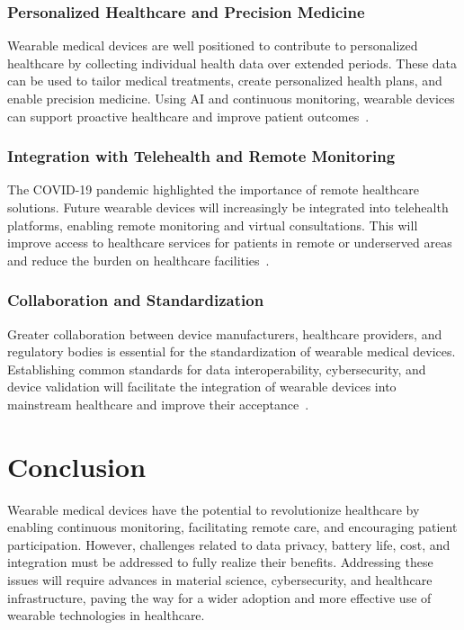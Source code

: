 \documentclass[journal]{IEEEtran}
\begin{document}
        \subsubsection{Personalized Healthcare and Precision Medicine}

        Wearable medical devices are well positioned to contribute to personalized healthcare by collecting individual health data over extended periods. These data can be used to tailor medical treatments, create personalized health plans, and enable precision medicine. Using AI and continuous monitoring, wearable devices can support proactive healthcare and improve patient outcomes~\cite{Cusack2024}.

        \subsubsection{Integration with Telehealth and Remote Monitoring}

        The COVID-19 pandemic highlighted the importance of remote healthcare solutions. Future wearable devices will increasingly be integrated into telehealth platforms, enabling remote monitoring and virtual consultations. This will improve access to healthcare services for patients in remote or underserved areas and reduce the burden on healthcare facilities~\cite{Nahavandi2022}.

        \subsubsection{Collaboration and Standardization}

        Greater collaboration between device manufacturers, healthcare providers, and regulatory bodies is essential for the standardization of wearable medical devices. Establishing common standards for data interoperability, cybersecurity, and device validation will facilitate the integration of wearable devices into mainstream healthcare and improve their acceptance~\cite{Ravizza2019}.




\section{Conclusion}
\label{10.Conclusion}
Wearable medical devices have the potential to revolutionize healthcare by enabling continuous monitoring, facilitating remote care, and encouraging patient participation. However, challenges related to data privacy, battery life, cost, and integration must be addressed to fully realize their benefits. Addressing these issues will require advances in material science, cybersecurity, and healthcare infrastructure, paving the way for a wider adoption and more effective use of wearable technologies in healthcare.
\end{document}
